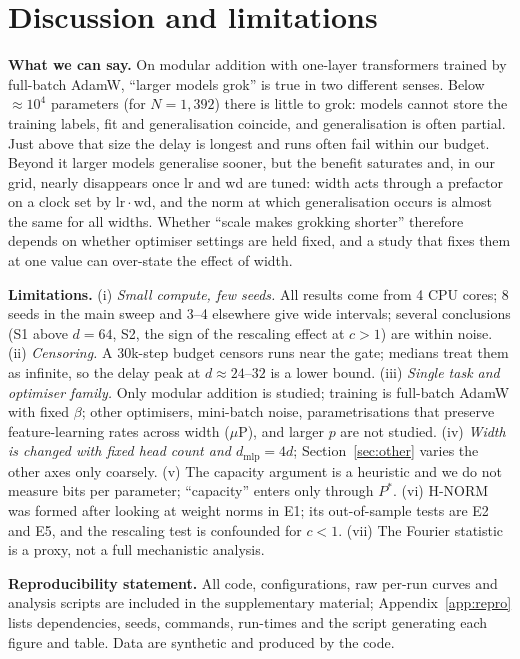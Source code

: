 \documentclass{article} %
\begin{document}
\section{Discussion and limitations}
\label{sec:disc}
\textbf{What we can say.} On modular addition with one-layer transformers trained by full-batch AdamW, ``larger models grok'' is true in two different senses. Below $\approx10^4$ parameters (for $N{=}1{,}392$) there is little to grok: models cannot store the training labels, fit and generalisation coincide, and generalisation is often partial. Just above that size the delay is longest and runs often fail within our budget. Beyond it larger models generalise sooner, but the benefit saturates and, in our grid, nearly disappears once lr and wd are tuned: width acts through a prefactor on a clock set by $\mathrm{lr\cdot wd}$, and the norm at which generalisation occurs is almost the same for all widths. Whether ``scale makes grokking shorter'' therefore depends on whether optimiser settings are held fixed, and a study that fixes them at one value can over-state the effect of width.

\textbf{Limitations.} (i) \emph{Small compute, few seeds.} All results come from 4 CPU cores; 8 seeds in the main sweep and 3--4 elsewhere give wide intervals; several conclusions (S1 above $d{=}64$, S2, the sign of the rescaling effect at $c>1$) are within noise. (ii) \emph{Censoring.} A 30k-step budget censors runs near the gate; medians treat them as infinite, so the delay peak at $d\approx24$--$32$ is a lower bound. (iii) \emph{Single task and optimiser family.} Only modular addition is studied; training is full-batch AdamW with fixed $\beta$; other optimisers, mini-batch noise, parametrisations that preserve feature-learning rates across width ($\mu$P), and larger $p$ are not studied. (iv) \emph{Width is changed with fixed head count and $d_{\mathrm{mlp}}=4d$}; Section~\ref{sec:other} varies the other axes only coarsely. (v) The capacity argument is a heuristic and we do not measure bits per parameter; ``capacity'' enters only through $P^\ast$. (vi) H-NORM was formed after looking at weight norms in E1; its out-of-sample tests are E2 and E5, and the rescaling test is confounded for $c<1$. (vii) The Fourier statistic is a proxy, not a full mechanistic analysis.

\textbf{Reproducibility statement.} All code, configurations, raw per-run curves and analysis scripts are included in the supplementary material; Appendix~\ref{app:repro} lists dependencies, seeds, commands, run-times and the script generating each figure and table. Data are synthetic and produced by the code.
\end{document}
